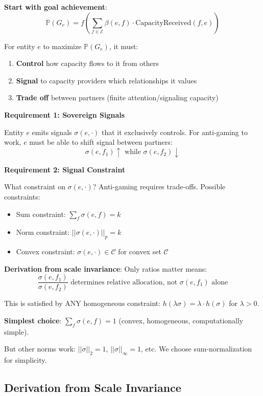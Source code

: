 \documentclass[11pt,a4paper]{article}
\theoremstyle{definition}
\theoremstyle{remark}
\newcommand{\E}{\mathcal{E}}
\begin{document}
\textbf{Start with goal achievement}:
\[ \mathbb{P}(G_e) = f\left(\sum_{f \in \E} \beta(e,f) \cdot \text{CapacityReceived}(f,e)\right) \]

For entity $e$ to maximize $\mathbb{P}(G_e)$, it must:
\begin{enumerate}
\item \textbf{Control} how capacity flows to it from others
\item \textbf{Signal} to capacity providers which relationships it values
\item \textbf{Trade off} between partners (finite attention/signaling capacity)
\end{enumerate}

\textbf{Requirement 1: Sovereign Signals}

Entity $e$ emits signals $\sigma(e, \cdot)$ that it exclusively controls. For anti-gaming to work, $e$ must be able to shift signal between partners:
\[ \sigma(e,f_1) \uparrow \text{ while } \sigma(e,f_2) \downarrow \]

\textbf{Requirement 2: Signal Constraint}

What constraint on $\sigma(e, \cdot)$? Anti-gaming requires trade-offs. Possible constraints:
\begin{itemize}
\item Sum constraint: $\sum_f \sigma(e,f) = k$
\item Norm constraint: $||\sigma(e, \cdot)||_p = k$
\item Convex constraint: $\sigma(e, \cdot) \in \mathcal{C}$ for convex set $\mathcal{C}$
\end{itemize}

\textbf{Derivation from scale invariance}: Only ratios matter means:
\[ \frac{\sigma(e,f_1)}{\sigma(e,f_2)} \text{ determines relative allocation, not } \sigma(e,f_1) \text{ alone} \]

This is satisfied by ANY homogeneous constraint: $h(\lambda \sigma) = \lambda \cdot h(\sigma)$ for $\lambda > 0$.

\textbf{Simplest choice}: $\sum_f \sigma(e,f) = 1$ (convex, homogeneous, computationally simple).

But other norms work: $||\sigma||_2 = 1$, $||\sigma||_\infty = 1$, etc. We choose sum-normalization for simplicity.

\subsection{Derivation from Scale Invariance}
\end{document}
